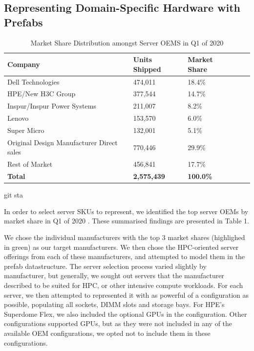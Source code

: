 \documentclass[11pt]{article}
\begin{document}
	\subsection{Representing Domain-Specific Hardware with Prefabs}
		\begin{table}[ht!]
		\centering
		\begin{tabular}{|l|ll|ll}
		\cline{1-3}
		Company                                             & Units Shipped                   & Market Share                     \\ \hline
		\cellcolor[HTML]{9AFF99}Dell Technologies           & \cellcolor[HTML]{9AFF99}474,011 & \cellcolor[HTML]{9AFF99}18.4\%   \\
		\cellcolor[HTML]{9AFF99}HPE/New H3C Group           & \cellcolor[HTML]{9AFF99}377,544 & \cellcolor[HTML]{9AFF99}14.7\%   \\
		\cellcolor[HTML]{9AFF99}Inspur/Inspur Power Systems & \cellcolor[HTML]{9AFF99}211,007 & \cellcolor[HTML]{9AFF99}8.2\%    \\
		Lenovo                                              & 153,570                         & 6.0\%                            \\
		Super Micro                                         & 132,001                         & 5.1\%                            \\
		Original Design Manufacturer Direct sales                                         & 770,446                         & 29.9\%                           \\
		Rest of Market                                      & 456,841                         & 17.7\%                           \\ \cline{1-3}
		\textbf{Total}                                      & \textbf{2,575,439}              & \textbf{100.0\%}                 \\ \cline{1-3}
		\end{tabular}
		\caption{Market Share Distribution amongst Server OEMS in Q1 of 2020}
		\label{table:1}
		\end{table}git sta

		In order to select server SKUs to represent, we identified the top server OEMs by market share in Q1 of 2020 \cite{Macatee2020}. These summarised findings are presented in Table 1.
		
		We chose the individual manufacturers with the top 3 market shares (highlighed in green) as our target manufacturers.
		We then chose the HPC-oriented server offerings from each of these manufacturers, and attempted to model them in the prefab datastructure.
		The server selection process varied slightly by manufacturer, but generally, we sought out servers that the manufacturer described to be suited for HPC, or other intensive compute workloads.
		For each server, we then attempted to represented it with as powerful of a configuration as possible, populating all sockets, DIMM slots and storage bays.
		For HPE's Superdome Flex, we also included the optional GPUs in the configuration.
		Other configurations supported GPUs, but as they were not included in any of the available OEM configurations, we opted not to include them in these configurations.
\end{document}
